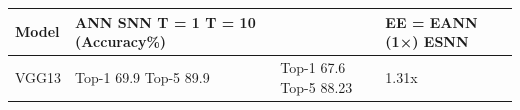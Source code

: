 \begin{tabular}{llll}
\toprule
Model & ANN SNN T = 1 T = 10 (Accuracy\%) &  & EE = EANN (1×) ESNN \\
\midrule
VGG13 & Top-1 69.9 Top-5 89.9 & Top-1 67.6 Top-5 88.23 & 1.31x \\
\bottomrule
\end{tabular}
